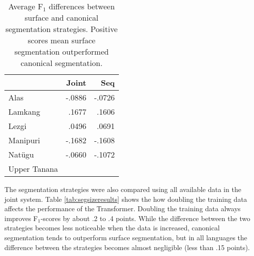 \begin{table}
    \centering
    \begin{tabular}{l|r|r}
          & \textbf{Joint} & \textbf{Seq} \\
         \hline
         Alas  & -.0886 &  -.0726  \\
         \hline
         Lamkang  & .1677 & .1606  \\
         \hline
         Lezgi  & .0496 & .0691  \\
         \hline
         Manipuri  & -.1682 & -.1608   \\
         \hline
         Natügu  & -.0660 & -.1072  \\
         \hline
         Upper Tanana &  &  \\
    \end{tabular}
    \caption[F$_1$-score Differences between Surface and Canonical Segmentation]{Average F$_1$ differences between surface and canonical segmentation strategies. Positive scores mean surface segmentation outperformed canonical segmentation.}
    \label{tab:segdiffresults}
\end{table}


The segmentation strategies were also compared using all available data in the joint system. Table \ref{tab:segsizeresults} shows the how doubling the training data affects the performance of the Transformer. Doubling the training data always improves F$_1$-scores by about .2 to .4 points. While the difference between the two strategies becomes less noticeable when the data is increased, canonical segmentation tends to outperform surface segmentation, but in all languages the difference between the strategies becomes almost negligible (less than .15 points). 

